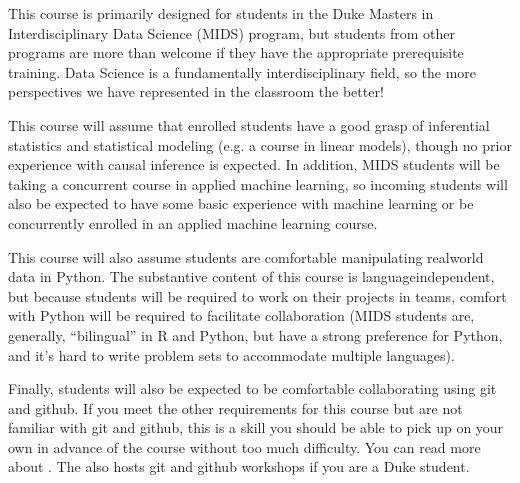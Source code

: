 \documentclass[letterpaper,10pt,english]{jupyterBook}
\begin{document}
\begin{DUlineblock}{0em}
\item[] 
\end{DUlineblock}

\sphinxAtStartPar
This course is primarily designed for students in the Duke Masters in Interdisciplinary Data Science (MIDS) program, but students from other programs are more than welcome if they have the appropriate pre\sphinxhyphen{}requisite training. Data Science is a fundamentally interdisciplinary field, so the more perspectives we have represented in the classroom the better!

\sphinxAtStartPar
This course will assume that enrolled students have a good grasp of inferential statistics and statistical modeling (e.g. a course in linear models), though no prior experience with causal inference is expected. In addition, MIDS students will be taking a concurrent course in applied machine learning, so incoming students will also be expected to have some basic experience with machine learning or be concurrently enrolled in an applied machine learning course.

\sphinxAtStartPar
This course will also assume students are comfortable manipulating real\sphinxhyphen{}world data in Python. The substantive content of this course is language\sphinxhyphen{}independent, but because students will be required to work on their projects in teams, comfort with Python will be required to facilitate collaboration (MIDS students are, generally, “bilingual” in R and Python, but have a strong preference for Python, and it’s hard to write problem sets to accommodate multiple languages).

\sphinxAtStartPar
Finally, students will also be expected to be comfortable collaborating using git and github. If you meet the other requirements for this course but are not familiar with git and github, this is a skill you should be able to pick up on your own in advance of the course without too much difficulty. You can read more about . The  also hosts git and github workshops if you are a Duke student.

\begin{DUlineblock}{0em}
\item[] 
\end{DUlineblock}
\end{document}
